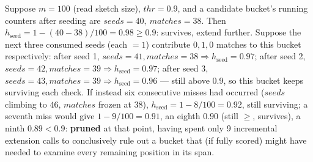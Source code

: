 Suppose $m=100$ (read sketch size), $\mathit{thr}=0.9$, and a candidate bucket's running counters
after seeding are $\mathit{seeds}=40,\ \mathit{matches}=38$. Then $h_{\mathrm{seed}} = 1 -
(40-38)/100 = 0.98 \ge 0.9$: survives, extend further. Suppose the next three consumed seeds (each
$=1$) contribute $0, 1, 0$ matches to this bucket respectively:
after seed 1, $\mathit{seeds}=41,\mathit{matches}=38 \Rightarrow h_{\mathrm{seed}}=0.97$; after
seed 2, $\mathit{seeds}=42,\mathit{matches}=39 \Rightarrow h_{\mathrm{seed}}=0.97$; after seed 3,
$\mathit{seeds}=43,\mathit{matches}=39 \Rightarrow h_{\mathrm{seed}}=0.96$ --- still above
$0.9$, so this bucket keeps surviving each check. If instead six consecutive misses had occurred
($\mathit{seeds}$ climbing to $46$, $\mathit{matches}$ frozen at $38$), $h_{\mathrm{seed}} = 1 -
8/100 = 0.92$, still surviving; a seventh miss would give $1-9/100=0.91$, an eighth $0.90$ (still
$\ge$, survives), a ninth $0.89 < 0.9$: \textbf{pruned} at that point, having spent only 9
incremental extension calls to conclusively rule out a bucket that (if fully scored) might have
needed to examine every remaining position in its span.
